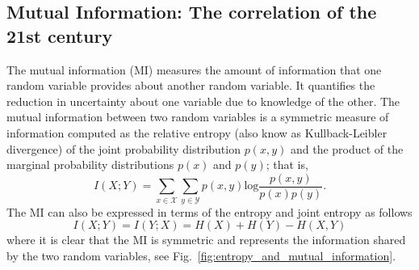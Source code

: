 \subsection{Mutual Information: The correlation of the 21st century }
The mutual information (MI) measures the amount of information that one random variable provides about another random variable. It quantifies the reduction in uncertainty about one variable due to knowledge of the other. The mutual information between two random variables is a symmetric measure of information computed as the relative entropy (also know as Kullback-Leibler divergence) of the joint probability distribution $p\left(x,y\right)$ and the product of the marginal probability distributions $p\left(x\right)$ and $p\left(y\right)$; that is,
\begin{equation}\label{eq:mutual_information}
	I\left(X;Y\right) = \sum_{x \in \mathcal{X}}\sum_{y \in \mathcal{Y}}p\left(x,y\right) \text{log}\frac{p\left(x,y\right)}{p\left(x\right)p\left(y\right)}.
\end{equation}
The MI can also be expressed in terms of the entropy and joint entropy as follows
\begin{equation}\label{eq:mutual_information}
	I\left(X;Y\right) =I\left(Y;X\right) = H(X) + H(Y) - H(X,Y)
\end{equation}
where it is clear that the MI is symmetric and represents the information shared by the two random variables, see Fig.~\ref{fig:entropy_and_mutual_information}.


